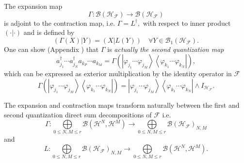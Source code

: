 \documentclass[aps,preprint]{revtex4}%
\begin{document}
The expansion map
\begin{equation}
\Gamma:\mathcal{B}\left(  \mathcal{H}_{\mathcal{F}}\right)  \rightarrow
\mathcal{B}\left(  \mathcal{H}_{\mathcal{F}}\right)
\end{equation}
is adjoint to the contraction map, i.e. $\Gamma=L^{\dagger},$ with respect to
inner product $\left(  \cdot\left\vert \cdot\right.  \right)  $ and is defined
by
\begin{equation}
\left(  \Gamma\left(  X\right)  \left\vert Y\right.  \right)  =\left(
X\left\vert L\left(  Y\right)  \right.  \right)  \quad\forall Y\in
\mathcal{B}_{1}\left(  \mathcal{H}_{\mathcal{F}}\right)  .
\end{equation}
One can show (Appendix ) that $\Gamma$ is \emph{actually the second
quantization map}
\begin{equation}
a_{j_{1}}^{\dagger}\cdots a_{j_{N}}^{\dagger}a_{k_{P}}\cdots a_{k_{M}}%
=\Gamma\left(  \left\vert \varphi_{j_{1}}\cdots\varphi_{j_{M}}\right\rangle
\left\langle \varphi_{k_{1}}\cdots\varphi_{k_{N}}\right\vert \right)  ,
\end{equation}
which can be expressed as exterior multiplication by the identity operator in
$\mathcal{F}$
\begin{equation}
\Gamma\left(  \left\vert \varphi_{j_{1}}\cdots\varphi_{j_{M}}\right\rangle
\left\langle \varphi_{k_{1}}\cdots\varphi_{k_{N}}\right\vert \right)
=\left\vert \varphi_{j_{1}}\cdots\varphi_{j_{M}}\right\rangle \left\langle
\varphi_{k_{1}}\cdots\varphi_{k_{N}}\right\vert \wedge I_{\mathcal{H}%
_{\mathcal{F}}}.
\end{equation}


The expansion and contraction maps transform naturally between the first and
second quantization direct sum decompositions of $\mathcal{F}$ i.e.
\begin{equation}
\Gamma:%
{\displaystyle\bigoplus\limits_{0\leq N,M\leq r}}
\mathcal{B}\left(  \mathcal{H}^{N},\mathcal{H}^{M}\right)  \rightarrow%
{\displaystyle\bigoplus\limits_{0\leq N,M\leq r}}
\mathcal{B}\left(  \mathcal{H}_{\mathcal{F}}\right)  _{N,M}%
\end{equation}
and
\begin{equation}
L:%
{\displaystyle\bigoplus\limits_{0\leq N,M\leq r}}
\mathcal{B}\left(  \mathcal{H}_{\mathcal{F}}\right)  _{N,M}\rightarrow%
{\displaystyle\bigoplus\limits_{0\leq N,M\leq r}}
\mathcal{B}\left(  \mathcal{H}^{N},\mathcal{H}^{M}\right)  .
\end{equation}
\end{document}
